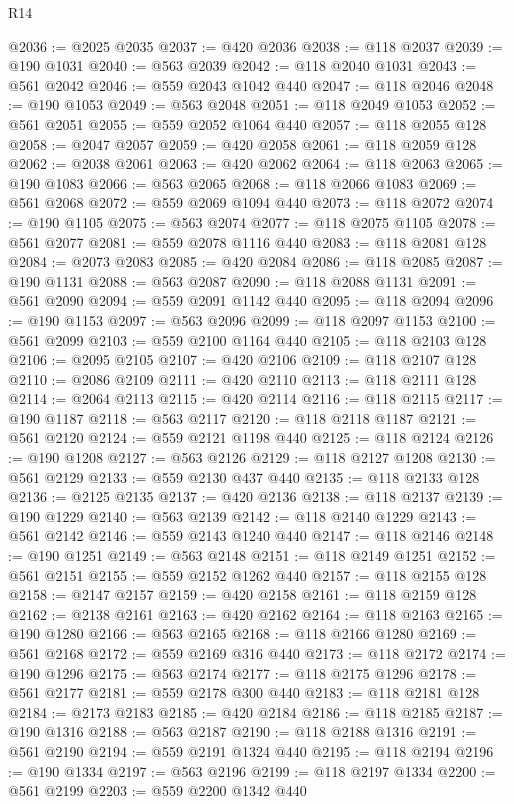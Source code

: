 \begin{lexlean}{R14}
\begin{coremodule}
{{{{{{{{{{{{{{{{{{{{{{{{{{{{{{{{{{{{{{{{{{{{{{{{{{{{{{{{{{{{{{{{{{{{{{{{{{{{{{{{{{@2036 := @2025 @2035
@2037 := @420 @2036
@2038 := @118 @2037
@2039 := @190 @1031
@2040 := @563 @2039
@2042 := @118 @2040 @1031
@2043 := @561 @2042
@2046 := @559 @2043 @1042 @440
@2047 := @118 @2046
@2048 := @190 @1053
@2049 := @563 @2048
@2051 := @118 @2049 @1053
@2052 := @561 @2051
@2055 := @559 @2052 @1064 @440
@2057 := @118 @2055 @128
@2058 := @2047 @2057
@2059 := @420 @2058
@2061 := @118 @2059 @128
@2062 := @2038 @2061
@2063 := @420 @2062
@2064 := @118 @2063
@2065 := @190 @1083
@2066 := @563 @2065
@2068 := @118 @2066 @1083
@2069 := @561 @2068
@2072 := @559 @2069 @1094 @440
@2073 := @118 @2072
@2074 := @190 @1105
@2075 := @563 @2074
@2077 := @118 @2075 @1105
@2078 := @561 @2077
@2081 := @559 @2078 @1116 @440
@2083 := @118 @2081 @128
@2084 := @2073 @2083
@2085 := @420 @2084
@2086 := @118 @2085
@2087 := @190 @1131
@2088 := @563 @2087
@2090 := @118 @2088 @1131
@2091 := @561 @2090
@2094 := @559 @2091 @1142 @440
@2095 := @118 @2094
@2096 := @190 @1153
@2097 := @563 @2096
@2099 := @118 @2097 @1153
@2100 := @561 @2099
@2103 := @559 @2100 @1164 @440
@2105 := @118 @2103 @128
@2106 := @2095 @2105
@2107 := @420 @2106
@2109 := @118 @2107 @128
@2110 := @2086 @2109
@2111 := @420 @2110
@2113 := @118 @2111 @128
@2114 := @2064 @2113
@2115 := @420 @2114
@2116 := @118 @2115
@2117 := @190 @1187
@2118 := @563 @2117
@2120 := @118 @2118 @1187
@2121 := @561 @2120
@2124 := @559 @2121 @1198 @440
@2125 := @118 @2124
@2126 := @190 @1208
@2127 := @563 @2126
@2129 := @118 @2127 @1208
@2130 := @561 @2129
@2133 := @559 @2130 @437 @440
@2135 := @118 @2133 @128
@2136 := @2125 @2135
@2137 := @420 @2136
@2138 := @118 @2137
@2139 := @190 @1229
@2140 := @563 @2139
@2142 := @118 @2140 @1229
@2143 := @561 @2142
@2146 := @559 @2143 @1240 @440
@2147 := @118 @2146
@2148 := @190 @1251
@2149 := @563 @2148
@2151 := @118 @2149 @1251
@2152 := @561 @2151
@2155 := @559 @2152 @1262 @440
@2157 := @118 @2155 @128
@2158 := @2147 @2157
@2159 := @420 @2158
@2161 := @118 @2159 @128
@2162 := @2138 @2161
@2163 := @420 @2162
@2164 := @118 @2163
@2165 := @190 @1280
@2166 := @563 @2165
@2168 := @118 @2166 @1280
@2169 := @561 @2168
@2172 := @559 @2169 @316 @440
@2173 := @118 @2172
@2174 := @190 @1296
@2175 := @563 @2174
@2177 := @118 @2175 @1296
@2178 := @561 @2177
@2181 := @559 @2178 @300 @440
@2183 := @118 @2181 @128
@2184 := @2173 @2183
@2185 := @420 @2184
@2186 := @118 @2185
@2187 := @190 @1316
@2188 := @563 @2187
@2190 := @118 @2188 @1316
@2191 := @561 @2190
@2194 := @559 @2191 @1324 @440
@2195 := @118 @2194
@2196 := @190 @1334
@2197 := @563 @2196
@2199 := @118 @2197 @1334
@2200 := @561 @2199
@2203 := @559 @2200 @1342 @440
}}}}}}}}}}}}}}}}}}}}}}}}}}}}}}}}}}}}}}}}}}}}}}}}}}}}}}}}}}}}}}}}}}}}}}}}}}}}}}}}}}
\end{coremodule}
\end{lexlean}
